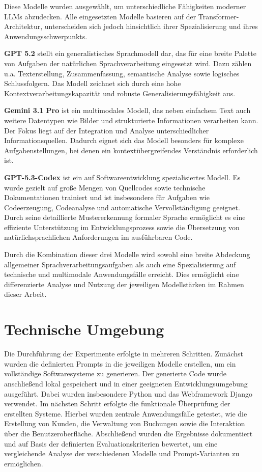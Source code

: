 Diese Modelle wurden ausgewählt, um unterschiedliche Fähigkeiten moderner LLMs abzudecken. Alle eingesetzten Modelle basieren auf der Transformer-Architektur, unterscheiden sich jedoch hinsichtlich ihrer Spezialisierung und ihres Anwendungsschwerpunkts.

\textbf{GPT 5.2} stellt ein generalistisches Sprachmodell dar, das für eine breite Palette von Aufgaben der natürlichen Sprachverarbeitung eingesetzt wird. Dazu zählen u.a. Texterstellung, Zusammenfassung, semantische Analyse sowie logisches Schlussfolgern. Das Modell zeichnet sich durch eine hohe Kontextverarbeitungskapazität und robuste Generalisierungsfähigkeit aus.

\textbf{Gemini 3.1 Pro} ist ein multimodales Modell, das neben einfachem Text auch weitere Datentypen wie Bilder und strukturierte Informationen verarbeiten kann. Der Fokus liegt auf der Integration und Analyse unterschiedlicher Informationsquellen. Dadurch eignet sich das Modell besonders für komplexe Aufgabenstellungen, bei denen ein kontextübergreifendes Verständnis erforderlich ist.

\textbf{GPT-5.3-Codex} ist ein auf Softwareentwicklung spezialisiertes Modell. Es wurde gezielt auf große Mengen von Quellcodes sowie technische Dokumentationen trainiert und ist insbesondere für Aufgaben wie Codeerzeugung, Codeanalyse und automatische Vervollständigung geeignet. Durch seine detaillierte Mustererkennung formaler Sprache ermöglicht es eine effiziente Unterstützung im Entwicklungsprozess sowie die Übersetzung von natürlichsprachlichen Anforderungen im ausführbaren Code.

Durch die Kombination dieser drei Modelle wird sowohl eine breite Abdeckung allgemeiner Sprachverarbeitungsaufgaben als auch eine Spezialisierung auf technische und multimodale Anwendungsfälle erreicht. Dies ermöglicht eine differenzierte Analyse und Nutzung der jeweiligen Modellstärken im Rahmen dieser Arbeit.



\section{Technische Umgebung}


Die Durchführung der Experimente erfolgte in mehreren
Schritten. Zunächst wurden die definierten Prompts in die
jeweiligen Modelle erstellen, um ein vollständige
Softwaresysteme zu generieren. Der generierte Code wurde anschließend lokal gespeichert
und in einer geeigneten Entwicklungsumgebung ausgeführt.
Dabei wurden insbesondere Python und das Webframework
Django verwendet. Im nächsten Schritt erfolgte die funktionale Überprüfung
der erstellten Systeme. Hierbei wurden zentrale
Anwendungsfälle getestet, wie die Erstellung von Kunden,
die Verwaltung von Buchungen sowie die Interaktion über
die Benutzeroberfläche. Abschließend wurden die Ergebnisse dokumentiert und auf
Basis der definierten Evaluationskriterien bewertet, um
eine vergleichende Analyse der verschiedenen Modelle und
Prompt-Varianten zu ermöglichen.




